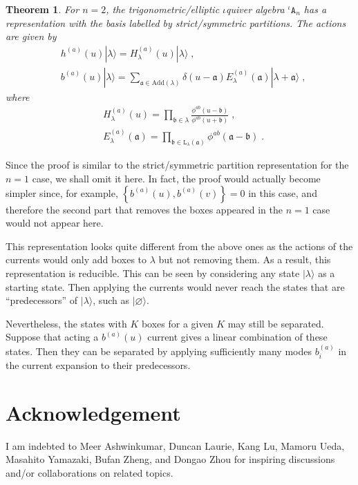 \documentclass[11pt]{article}
\numberwithin{equation}{section}
\numberwithin{figure}{section}
\numberwithin{table}{section}
\newtheorem{theorem}{Theorem}[section]
\begin{document}
\begin{theorem}
	For $n=2$, the trigonometric/elliptic $\iota$quiver algebra ${}^\iota\mathtt{A}_n$ has a representation with the basis labelled by strict/symmetric partitions. The actions are given by
	\begin{subequations}
		\begin{align}
			&h^{(a)}(u)|\lambda\rangle=H^{(a)}_\lambda(u)|\lambda\rangle\;,\\
			&b^{(a)}(u)|\lambda\rangle=\sum_{\mathfrak{a}\in\mathrm{Add}(\lambda)}\delta(u-\mathfrak{a})E^{(a)}_{\lambda}(\mathfrak{a})|\lambda+\mathfrak{a}\rangle\;,
		\end{align}
	\end{subequations}
	where
	\begin{subequations}
		\begin{align}
			&H^{(a)}_\lambda(u)=\prod_{\mathfrak{b}\in\lambda}\frac{\phi^{ab}(u-\mathfrak{b})}{\phi^{ab}(u+\mathfrak{b})}\;,\\
			&E^{(a)}_\lambda(\mathfrak{a})=\prod_{\mathfrak{b}\in\mathtt{L}_\lambda(\mathfrak{a})}\phi^{ab}(\mathfrak{a}-\mathfrak{b})\;.
		\end{align}
	\end{subequations}
\end{theorem}
Since the proof is similar to the strict/symmetric partition representation for the $n=1$ case, we shall omit it here. In fact, the proof would actually become simpler since, for example, $\left\{b^{(a)}(u),b^{(a)}(v)\right\}=0$ in this case, and therefore the second part that removes the boxes appeared in the $n=1$ case would not appear here.

This representation looks quite different from the above ones as the actions of the currents would only add boxes to $\lambda$ but not removing them. As a result, this representation is reducible. This can be seen by considering any state $|\lambda\rangle$ as a starting state. Then applying the currents would never reach the states that are ``predecessors'' of $|\lambda\rangle$, such as $|\varnothing\rangle$.

Nevertheless, the states with $K$ boxes for a given $K$ may still be separated. Suppose that acting a $b^{(a)}(u)$ current gives a linear combination of these states. Then they can be separated by applying sufficiently many modes $b^{(a)}_i$ in the current expansion to their predecessors.

\section*{Acknowledgement} I am indebted to Meer Ashwinkumar, Duncan Laurie, Kang Lu, Mamoru Ueda, Masahito Yamazaki, Bufan Zheng, and Dongao Zhou for inspiring discussions and/or collaborations on related topics.
\end{document}
